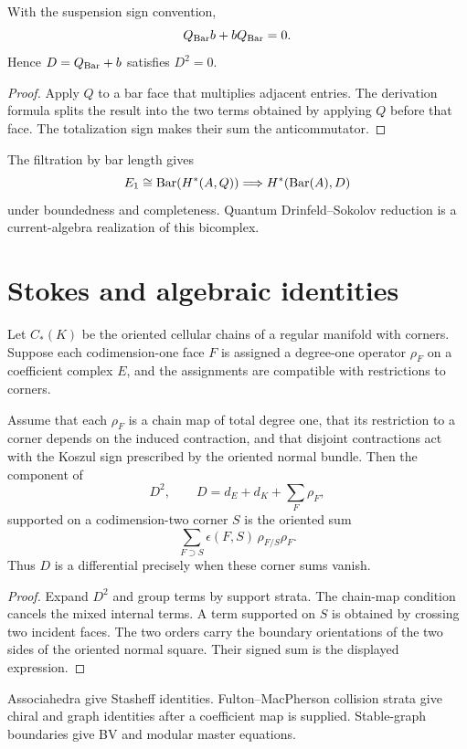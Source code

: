 \begin{proposition}
With the suspension sign convention,
\[
 Q_{\operatorname{Bar}}b+bQ_{\operatorname{Bar}}=0.
\]
Hence $D=Q_{\operatorname{Bar}}+b$ satisfies $D^2=0$.
\end{proposition}
\begin{proof}
Apply $Q$ to a bar face that multiplies adjacent entries. The derivation formula splits the result into the two terms obtained by applying $Q$ before that face. The totalization sign makes their sum the anticommutator.
\end{proof}

The filtration by bar length gives
\[
 E_1\cong\operatorname{Bar}(H^*(A,Q))
 \Longrightarrow H^*(\operatorname{Bar}(A),D)
\]
under boundedness and completeness. Quantum Drinfeld--Sokolov reduction is a current-algebra realization of this bicomplex.

\chapter{Stokes and algebraic identities}
Let $C_*(K)$ be the oriented cellular chains of a regular manifold with corners. Suppose each codimension-one face $F$ is assigned a degree-one operator $\rho_F$ on a coefficient complex $E$, and the assignments are compatible with restrictions to corners.

\begin{theorem}
Assume that each $\rho_F$ is a chain map of total degree one, that its restriction to a corner depends on the induced contraction, and that disjoint contractions act with the Koszul sign prescribed by the oriented normal bundle. Then the component of
\[
 D^2,\qquad D=d_E+d_K+\sum_F\rho_F,
\]
supported on a codimension-two corner $S$ is the oriented sum
\[
 \sum_{F\supset S}\epsilon(F,S)\,\rho_{F/S}\rho_F.
\]
Thus $D$ is a differential precisely when these corner sums vanish.
\end{theorem}
\begin{proof}
Expand $D^2$ and group terms by support strata. The chain-map condition cancels the mixed internal terms. A term supported on $S$ is obtained by crossing two incident faces. The two orders carry the boundary orientations of the two sides of the oriented normal square. Their signed sum is the displayed expression.
\end{proof}

Associahedra give Stasheff identities. Fulton--MacPherson collision strata give chiral and graph identities after a coefficient map is supplied. Stable-graph boundaries give BV and modular master equations.

